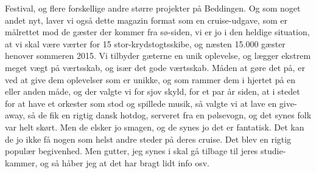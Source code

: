 Festival, og flere forskellige andre større projekter på Beddingen. Og som noget andet nyt, laver vi også dette magazin format som en cruise-udgave, som er målrettet mod de gæster der kommer fra sø-siden, vi er jo i den heldige situation, at vi skal være værter for 15 stor-krydstogtsskibe, og næsten 15.000 gæster henover sommeren 2015. Vi tilbyder gæterne en unik oplevelse, og lægger ekstrem meget vægt på værtsskab, og især det gode værtsskab. Måden at gøre det på, er ved at give dem oplevelser som er unikke, og som rammer dem i hjertet på en eller anden måde, og der valgte vi for sjov skyld, for et par år siden, at i stedet for at have et orkester som stod og spillede musik, så valgte vi at lave en give-away, så de fik en rigtig dansk hotdog, serveret fra en pølsevogn, og det synes folk var helt skørt. Men de elsker jo smagen, og de synes jo det er fantatisk. Det kan de jo ikke få nogen som helst andre steder på deres cruise. Det blev en rigtig populær begivenhed. Men gutter, jeg synes i skal gå tilbage til jeres studie-kammer, og så håber jeg at det har bragt lidt info osv. 
